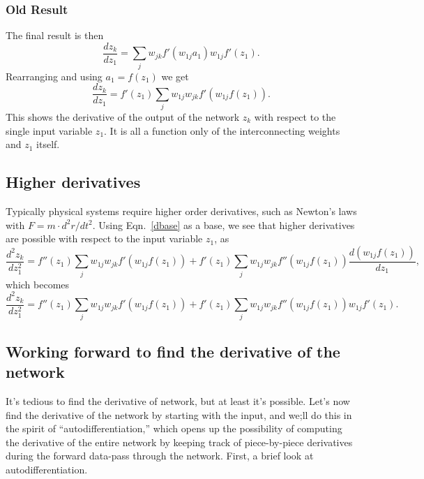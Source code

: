 \documentclass[12pt]{article}
\begin{document}
\subsubsection{Old Result}
The final result is then
\begin{equation}
\frac{dz_k}{dz_1}=\sum_j w_{jk}f'(w_{1j}{a_1})w_{1j}f'(z_1).
\end{equation}
Rearranging and using $a_1=f(z_1)$ we get
\begin{equation}
\frac{dz_k}{dz_1}=f'(z_1)\sum_j w_{1j}w_{jk}f'(w_{1j}{f(z_1)}).
\label{dbase}
\end{equation}
This shows the derivative of the output of the network $z_k$ with respect to the single input variable $z_1$. It is all a function only of the interconnecting weights and $z_1$ itself.

\subsection{Higher derivatives}

Typically physical systems require higher order derivatives, such as Newton's laws with $F=m\cdot d^2r/dt^2$.  
Using Eqn.~\ref{dbase} as a base, we see that higher derivatives are possible with respect to the input variable $z_1$, as
\begin{equation}
\frac{d^2z_k}{dz_1^2}=f''(z_1)\sum_j w_{1j}w_{jk}f'(w_{1j}{f(z_1)}) + f'(z_1)\sum_j w_{1j}w_{jk}f''\left(w_{1j}f(z_1)\right)\frac{d(w_{1j}f(z_1))}{dz_1},
\end{equation}
which becomes
\begin{equation}
\frac{d^2z_k}{dz_1^2}=f''(z_1)\sum_j w_{1j}w_{jk}f'(w_{1j}{f(z_1)}) + f'(z_1)\sum_j w_{1j}w_{jk}f''\left(w_{1j}f(z_1)\right)w_{1j}f'(z_1).
\end{equation}

\subsection{Working forward to find the derivative of the network}
\label{dforward}

It's tedious to find the derivative of network, but at least it's possible.  Let's now find the derivative of the network by starting with the input, and we;ll do this in the spirit of ``autodifferentiation,'' which opens up the possibility of computing the derivative of the entire network by keeping track of piece-by-piece derivatives during the forward data-pass through the network. First, a brief look at autodifferentiation.
\end{document}
